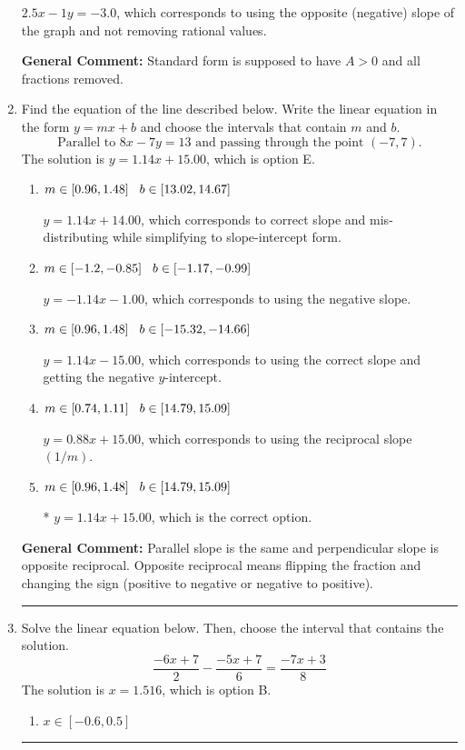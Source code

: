\documentclass{extbook}[14pt]
\newcommand{\litem}[1]{\item #1

\rule{\textwidth}{0.4pt}}
\begin{document}
\begin{enumerate}
{\begin{enumerate}[label=\Alph*.]
 $2.5x - 1y = -3.0$, which corresponds to using the opposite (negative) slope of the graph and not removing rational values.
\end{enumerate}

\textbf{General Comment:} Standard form is supposed to have $A > 0$ and all fractions removed.
}
\litem{
Find the equation of the line described below. Write the linear equation in the form $ y=mx+b $ and choose the intervals that contain $m$ and $b$.
\[ \text{Parallel to } 8 x - 7 y = 13 \text{ and passing through the point } (-7, 7). \]The solution is \( y = 1.14x + 15.00 \), which is option E.\begin{enumerate}[label=\Alph*.]
\item \( m \in [0.96, 1.48] \hspace*{3mm} b \in [13.02, 14.67] \)

 $y = 1.14x + 14.00$, which corresponds to correct slope and mis-distributing while simplifying to slope-intercept form.
\item \( m \in [-1.2, -0.85] \hspace*{3mm} b \in [-1.17, -0.99] \)

 $y = -1.14x - 1.00$, which corresponds to using the negative slope.
\item \( m \in [0.96, 1.48] \hspace*{3mm} b \in [-15.32, -14.66] \)

 $y = 1.14x - 15.00$, which corresponds to using the correct slope and getting the negative $y$-intercept.
\item \( m \in [0.74, 1.11] \hspace*{3mm} b \in [14.79, 15.09] \)

 $y = 0.88x + 15.00$, which corresponds to using the reciprocal slope $(1/m)$.
\item \( m \in [0.96, 1.48] \hspace*{3mm} b \in [14.79, 15.09] \)

* $y = 1.14x + 15.00$, which is the correct option.
\end{enumerate}

\textbf{General Comment:} Parallel slope is the same and perpendicular slope is opposite reciprocal. Opposite reciprocal means flipping the fraction and changing the sign (positive to negative or negative to positive).
}
\litem{
Solve the linear equation below. Then, choose the interval that contains the solution.
\[ \frac{-6x + 7}{2} - \frac{-5x + 7}{6} = \frac{-7x + 3}{8} \]The solution is \( x = 1.516 \), which is option B.\begin{enumerate}[label=\Alph*.]
\item \( x \in [-0.6, 0.5] \)


\end{enumerate}}
\end{enumerate}
\end{document}
